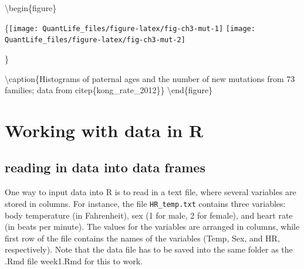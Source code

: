 \documentclass[
]{book}
\newenvironment{Shaded}{\begin{snugshade}}{\end{snugshade}}
\newcommand{\DataTypeTok}[1]{\textcolor[rgb]{0.13,0.29,0.53}{#1}}
\newcommand{\DecValTok}[1]{\textcolor[rgb]{0.00,0.00,0.81}{#1}}
\newcommand{\KeywordTok}[1]{\textcolor[rgb]{0.13,0.29,0.53}{\textbf{#1}}}
\newcommand{\NormalTok}[1]{#1}
\newcommand{\OperatorTok}[1]{\textcolor[rgb]{0.81,0.36,0.00}{\textbf{#1}}}
\newcommand{\OtherTok}[1]{\textcolor[rgb]{0.56,0.35,0.01}{#1}}
\newcommand{\StringTok}[1]{\textcolor[rgb]{0.31,0.60,0.02}{#1}}
\theoremstyle{definition}
\theoremstyle{definition}
\theoremstyle{definition}
\theoremstyle{remark}
\begin{document}
\textbackslash begin\{figure\}

\{\centering \texttt{[image: QuantLife\_files/figure-latex/fig-ch3-mut-1]} \texttt{[image: QuantLife\_files/figure-latex/fig-ch3-mut-2]}

\}

\textbackslash caption\{Histograms of paternal ages and the number of new mutations from 73 families; data from citep\{kong\_rate\_2012\}\}\label{fig:fig-ch3-mut}
\textbackslash end\{figure\}

\hypertarget{working-with-data-in-r}{%
\section{Working with data in R}\label{working-with-data-in-r}}

\label{sec:comp3}

\hypertarget{reading-in-data-into-data-frames}{%
\subsection{reading in data into data frames}\label{reading-in-data-into-data-frames}}

One way to input data into R is to read in a text file, where several variables are stored in columns. For instance, the file \texttt{HR\_temp.txt} contains three variables: body temperature (in Fahrenheit), sex (1 for male, 2 for female), and heart rate (in beats per minute). The values for the variables are arranged in columns, while first row of the file contains the names of the variables (Temp, Sex, and HR, respectively). Note that the data file has to be saved into the same folder as the .Rmd file week1.Rmd for this to work.

\begin{Shaded}
\end{Shaded}
\end{document}
